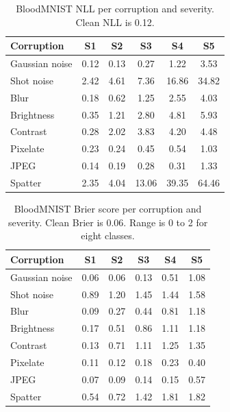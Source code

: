 \documentclass[a4paper,11pt,en,citestyle=authoryear,bibstyle=authoryear]{elegantpaper}
\begin{document}
\begin{table}[H]
  \centering
  \caption{BloodMNIST NLL per corruption and severity. Clean NLL is 0.12.}
  \label{tab:blood-nll}
  \begin{tabular}{lccccc}
    \toprule
    Corruption & S1 & S2 & S3 & S4 & S5 \\
    \midrule
    Gaussian noise & 0.12 & 0.13 & 0.27 & 1.22 & 3.53 \\
    Shot noise & 2.42 & 4.61 & 7.36 & 16.86 & 34.82 \\
    Blur & 0.18 & 0.62 & 1.25 & 2.55 & 4.03 \\
    Brightness & 0.35 & 1.21 & 2.80 & 4.81 & 5.93 \\
    Contrast & 0.28 & 2.02 & 3.83 & 4.20 & 4.48 \\
    Pixelate & 0.23 & 0.24 & 0.45 & 0.54 & 1.03 \\
    JPEG & 0.14 & 0.19 & 0.28 & 0.31 & 1.33 \\
    Spatter & 2.35 & 4.04 & 13.06 & 39.35 & 64.46 \\
    \bottomrule
  \end{tabular}
\end{table}

\begin{table}[H]
  \centering
  \caption{BloodMNIST Brier score per corruption and severity. Clean Brier is 0.06. Range is 0 to 2 for eight classes.}
  \label{tab:blood-brier}
  \begin{tabular}{lccccc}
    \toprule
    Corruption & S1 & S2 & S3 & S4 & S5 \\
    \midrule
    Gaussian noise & 0.06 & 0.06 & 0.13 & 0.51 & 1.08 \\
    Shot noise & 0.89 & 1.20 & 1.45 & 1.44 & 1.58 \\
    Blur & 0.09 & 0.27 & 0.44 & 0.81 & 1.18 \\
    Brightness & 0.17 & 0.51 & 0.86 & 1.11 & 1.18 \\
    Contrast & 0.13 & 0.71 & 1.11 & 1.25 & 1.35 \\
    Pixelate & 0.11 & 0.12 & 0.18 & 0.23 & 0.40 \\
    JPEG & 0.07 & 0.09 & 0.14 & 0.15 & 0.57 \\
    Spatter & 0.54 & 0.72 & 1.42 & 1.81 & 1.82 \\
    \bottomrule
  \end{tabular}
\end{table}
\end{document}
